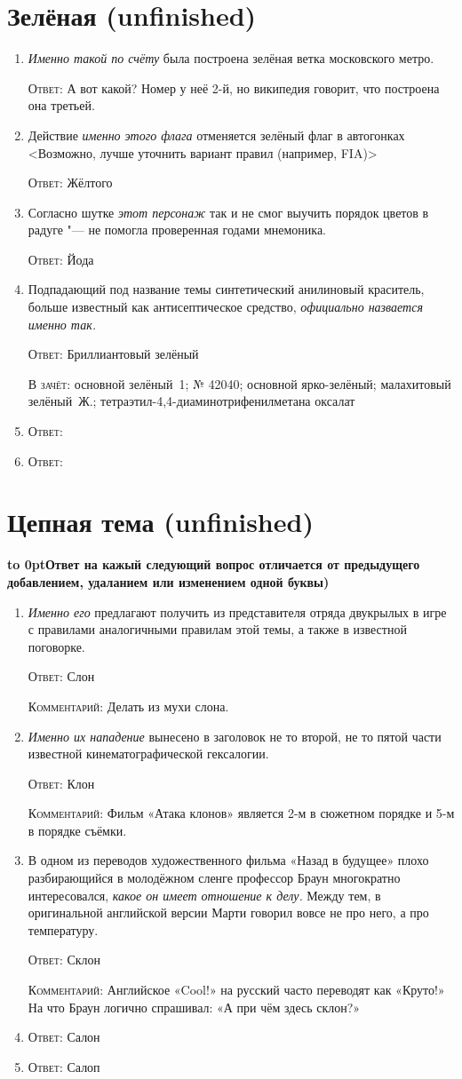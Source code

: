 \documentclass[a4paper,10pt]{article}
\let\keyword\textsc
\newenvironment{topic}{\begin{enumerate}}{\end{enumerate}}
\newcommand{\question}[3]{\item[#1.] #2 \par \keyword{Ответ:} #3}
\newcommand{\alternative}[1]{\par \keyword{В зачёт:} #1}
\newcommand{\commentary}[1]{\par \keyword{Комментарий:} #1}
\newcommand{\topiccommentary}[1]{\begin{adjustwidth}{0.9cm}{} \vspace{-0.3em}\textbf{\hbox to 0pt{\hss{(}}#1)} \end{adjustwidth}}
\begin{document}
\section{Зелёная (unfinished)}

\begin{topic}
 \question{??}{\emph{Именно такой по счёту} была построена зелёная ветка московского метро.}{А вот какой? Номер у неё 2-й, но википедия говорит, что построена она третьей.}
 \question{10--20}{Действие \emph{именно этого флага} отменяется зелёный флаг в автогонках <Возможно, лучше уточнить вариант правил (например, FIA)>}{Жёлтого}
 \question{20--30}{Согласно шутке \emph{этот персонаж} так и не смог выучить порядок цветов в радуге "--- не помогла проверенная годами мнемоника.}{Йода}
 \question{30--40}{Подпадающий под название темы синтетический анилиновый краситель, больше известный как антисептическое средство, \emph{официально назвается именно так.}}{Бриллиантовый зелёный}\alternative{основной зелёный~1; № 42040; основной ярко-зелёный; малахитовый зелёный~Ж.; тетраэтил-4,4-диаминотрифенилметана оксалат}
 \question{40}{}{}
 \question{50}{}{}
\end{topic}


\section{Цепная тема (unfinished)}
\topiccommentary{Ответ на кажый следующий вопрос отличается от предыдущего добавлением, удаланием или изменением одной буквы}

\begin{topic}
 \question{10}{\emph{Именно его} предлагают получить из представителя отряда двукрылых в игре с правилами аналогичными правилам этой темы, а также в известной поговорке.}{Слон}\commentary{Делать из мухи слона.}
 \question{20}{\emph{Именно их нападение} вынесено в заголовок не то второй, не то пятой части известной кинематографической гексалогии.}{Клон}\commentary{Фильм «Атака клонов» является 2-м в сюжетном порядке и 5-м в порядке съёмки.}
 \question{30}{В одном из переводов художественного фильма «Назад в будущее» плохо разбирающийся в молодёжном сленге профессор Браун многократно интересовался, \emph{какое он имеет отношение к делу.} Между тем, в оригинальной английской версии Марти говорил вовсе не про него, а про температуру.}{Склон}\commentary{Английское «Cool!» на русский часто переводят как «Круто!» На что Браун логично спрашивал: «А при чём здесь склон?»}
 \question{40}{}{Салон}
 \question{50}{}{Салоп}  %
\end{topic}
\end{document}
